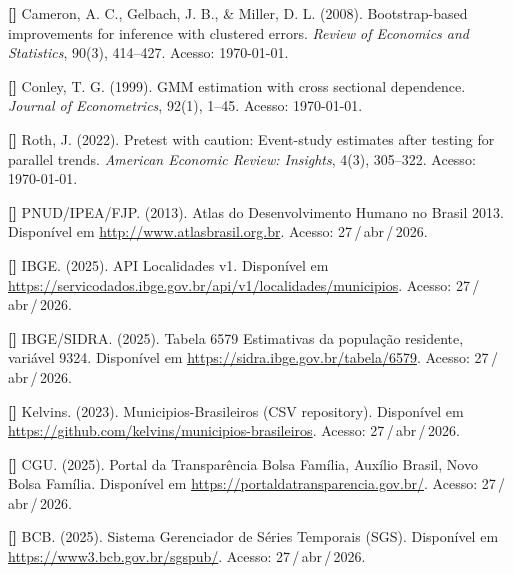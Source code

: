\documentclass[12pt,a4paper,oneside]{article}
\begin{document}
\begin{singlespace}
\small
\noindent
\textbf{[\label{ref:cgm}\theenumi]}
Cameron, A. C., Gelbach, J. B., \& Miller, D. L. (2008).
Bootstrap-based improvements for inference with clustered errors.
\textit{Review of Economics and Statistics}, 90(3), 414--427.
Acesso: \today.

\noindent
\textbf{[\label{ref:conley}\theenumi]}
Conley, T. G. (1999). GMM estimation with cross sectional dependence.
\textit{Journal of Econometrics}, 92(1), 1--45. Acesso: \today.

\noindent
\textbf{[\label{ref:roth}\theenumi]}
Roth, J. (2022). Pretest with caution: Event-study estimates after
testing for parallel trends. \textit{American Economic Review:
Insights}, 4(3), 305--322. Acesso: \today.

\noindent
\textbf{[\label{ref:atlas}\theenumi]}
PNUD/IPEA/FJP. (2013). Atlas do Desenvolvimento Humano no Brasil
\textemdash{} 2013. Disponível em
\url{http://www.atlasbrasil.org.br}. Acesso: 27\,/\,abr\,/\,2026.

\noindent
\textbf{[\label{ref:ibge-loc}\theenumi]}
IBGE. (2025). API Localidades v1. Disponível em
\url{https://servicodados.ibge.gov.br/api/v1/localidades/municipios}.
Acesso: 27\,/\,abr\,/\,2026.

\noindent
\textbf{[\label{ref:sidra}\theenumi]}
IBGE/SIDRA. (2025). Tabela 6579 \textemdash{} Estimativas da
população residente, variável 9324. Disponível em
\url{https://sidra.ibge.gov.br/tabela/6579}. Acesso: 27\,/\,abr\,/\,2026.

\noindent
\textbf{[\label{ref:kelvins}\theenumi]}
Kelvins. (2023). Municipios-Brasileiros (CSV repository).
Disponível em
\url{https://github.com/kelvins/municipios-brasileiros}. Acesso:
27\,/\,abr\,/\,2026.

\noindent
\textbf{[\label{ref:cgu}\theenumi]}
CGU. (2025). Portal da Transparência \textemdash{} Bolsa Família,
Auxílio Brasil, Novo Bolsa Família. Disponível em
\url{https://portaldatransparencia.gov.br/}. Acesso: 27\,/\,abr\,/\,2026.

\noindent
\textbf{[\label{ref:bcb}\theenumi]}
BCB. (2025). Sistema Gerenciador de Séries Temporais (SGS).
Disponível em \url{https://www3.bcb.gov.br/sgspub/}. Acesso:
27\,/\,abr\,/\,2026.

\end{singlespace}
\end{document}
